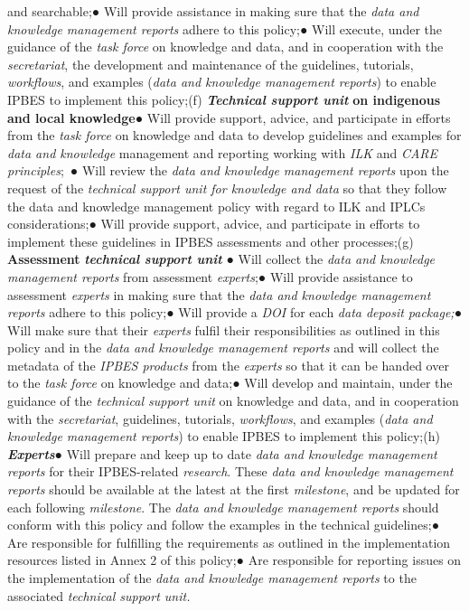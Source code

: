 \documentclass{article}
\begin{document}
and searchable;● Will provide assistance in making sure that the \textit{data and knowledge management reports} adhere to this policy;● Will execute, under the guidance of the \textit{task force }on knowledge and data, and in cooperation with the \textit{secretariat}, the development and maintenance of the guidelines, tutorials, \textit{workflows}, and examples (\textit{data and knowledge management reports}) to enable IPBES to implement this policy;(f) \textit{\textbf{Technical support unit}}\textbf{ on indigenous and local knowledge}● Will provide support, advice, and participate in efforts from the \textit{task force} on knowledge and data to develop guidelines and examples for \textit{data and knowledge} management and reporting working with\textit{ ILK} and \textit{CARE principles}; ● Will review the \textit{data and knowledge management reports} upon the request of the \textit{technical support unit for knowledge and data} so that they follow the data and knowledge management policy with regard to ILK and IPLCs considerations;● Will provide support, advice, and participate in efforts to implement these guidelines in IPBES assessments and other processes;(g) \textbf{Assessment }\textit{\textbf{technical support unit}} ● Will collect the \textit{data and knowledge management reports} from assessment \textit{experts};● Will provide assistance to assessment \textit{experts} in making sure that the \textit{data and knowledge management reports} adhere to this policy;● Will provide a \textit{DOI} for each \textit{data deposit package;}● Will make sure that their \textit{experts }fulfil their responsibilities as outlined in this policy and in the \textit{data and knowledge management reports} and will collect the metadata of the \textit{IPBES products }from the \textit{experts} so that it can be handed over to the \textit{task force }on knowledge and data;● Will develop and maintain, under the guidance of the \textit{technical support unit} on knowledge and data, and in cooperation with the \textit{secretariat}, guidelines, tutorials, \textit{workflows}, and examples (\textit{data and knowledge management reports}) to enable IPBES to implement this policy;(h) \textit{\textbf{Experts}}● Will prepare and keep up to date \textit{data and knowledge management reports} for their IPBES-related \textit{research}. These \textit{data and knowledge management reports }should be available at the latest at the first \textit{milestone}, and be updated for each following \textit{milestone}. The \textit{data and knowledge management reports} should conform with this policy and follow the examples in the technical guidelines;● Are responsible for fulfilling the requirements as outlined in the implementation resources listed in Annex 2 of this policy;● Are responsible for reporting issues on the implementation of the \textit{data and knowledge management reports} to the associated \textit{technical support unit.}
\end{document}
